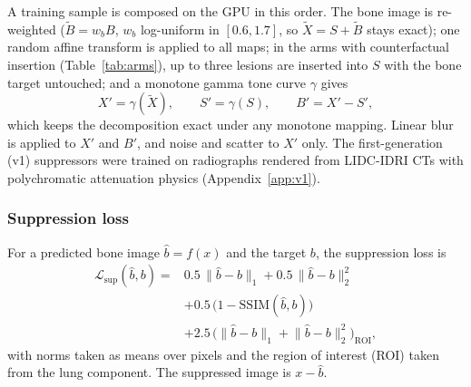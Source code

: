 A training sample is composed on the GPU in this order. The bone image is re-weighted ($\tilde B=w_bB$, $w_b$ log-uniform in $[0.6,1.7]$,
so $\tilde X=S+\tilde B$ stays exact); one random affine transform is applied to all maps; in the arms with counterfactual insertion
(Table~\ref{tab:arms}), up to three lesions are inserted into $S$ with the bone target untouched; and a monotone gamma tone curve $\gamma$
gives
\begin{equation}
X'=\gamma(\tilde X),\qquad S'=\gamma(S),\qquad B'=X'-S',
\label{eq:tone}
\end{equation}
which keeps the decomposition exact under any monotone mapping. Linear blur is applied to $X'$ and $B'$, and noise and scatter to $X'$
only. The first-generation (v1) suppressors were trained on radiographs rendered from LIDC-IDRI CTs with polychromatic attenuation physics
(Appendix~\ref{app:v1}).

\subsubsection{Suppression loss}
For a predicted bone image $\hat b=f(x)$ and the target $b$, the suppression loss is
\begin{equation}
\begin{split}
\mathcal{L}_{\mathrm{sup}}(\hat b,b)={}&0.5\,\lVert\hat b-b\rVert_1+0.5\,\lVert\hat b-b\rVert_2^2\\
&+0.5\,\big(1-\mathrm{SSIM}(\hat b,b)\big)\\
&+2.5\,\big(\lVert\hat b-b\rVert_1+\lVert\hat b-b\rVert_2^2\big)_{\mathrm{ROI}},
\end{split}
\label{eq:loss}
\end{equation}
with norms taken as means over pixels and the region of interest (ROI) taken from the lung component. The suppressed image is
$x-\hat b$.

